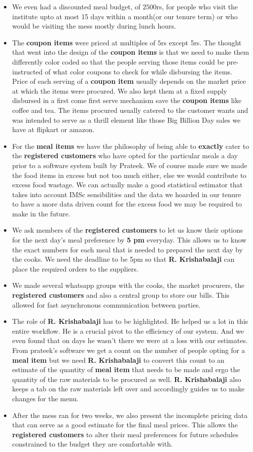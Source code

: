 \documentclass[12pt]{report}
\newcommand{\RC}{\textbf{registered customers}}
\begin{document}
\begin{itemize}
\item We even had a discounted meal budget, of $2500$rs, for people who visit the institute upto at most  15 days within a month(or our tenure term) or who would be visiting the mess mostly during lunch hours.
\item The \textbf{coupon items} were priced at multiples of $5$rs except 5rs. The thought that went into the design of the \textbf{coupon items} is that we need to make them differently color coded so that the people serving those items could be pre-instructed of what color coupons to check for while disbursing the items.
Price of each serving of a \textbf{coupon item} usually depends on the market price at which the items were procured. We also kept them at a fixed supply disbursed in a first come first serve mechanism save the \textbf{coupon items} like coffee and tea. The items procured usually catered to the customer wants and was intended to serve as a thrill element like those Big Billion Day sales we have at flipkart or amazon.
\item For the \textbf{meal items} we have the philosophy of being able to \textbf{exactly} cater to the {\RC} who have opted for the particular meals a day prior to a software system built by Prateek. We of course made sure we made the food items in excess but not too much either, else we would contribute to excess food wastage. We can actually make a good statistical estimator that takes into account IMSc sensibilities and the data we hoarded in our tenure to have a more data driven count for the excess food we may be required to make in the future.
\item We ask members of the {\RC} to let us know their options for the next day's meal preference by \textbf{5 pm} everyday. This allows us to know the exact numbers for each meal that is needed to prepared the next day by the cooks. We need the deadline to be 5pm so that \textbf{R. Krishabalaji} can place the required orders to the suppliers.
\item We made several whatsapp groups with the cooks, the market procurers, the {\RC} and also a central group to store our bills. This allowed for fast asynchronous communication between parties. 
\item  The role of \textbf{R. Krishabalaji} has to be highlighted. He helped us a lot in this entire workflow. He is a crucial pivot to the efficiency of our system. And we even found that on days he wasn't there we were at a loss with our estimates. From prateek's software we get a count on the number of people opting for a \textbf{meal item} but we need \textbf{R. Krishabalaji} to convert this count to an estimate of the quantity of \textbf{meal item} that needs to be made and ergo the quantity of the raw materials to be procured as well. 
\textbf{R. Krishabalaji} also keeps a tab on the raw materials left over and accordingly guides us to make changes for the menu. 
\item After the mess ran for two weeks, we also present the incomplete pricing data that can serve as a good estimate for the final meal prices. This allows the {\RC} to alter their meal preferences for future schedules constrained to the budget they are comfortable with.
\end{itemize}
\end{document}
